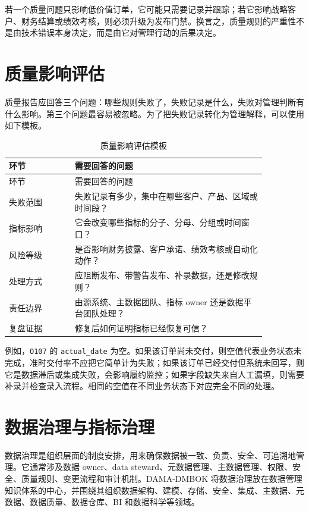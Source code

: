 \documentclass[UTF8,fontset=fandol,openany,zihao=-4]{ctexbook}
\begin{document}
若一个质量问题只影响低价值订单，它可能只需要记录并跟踪；若它影响战略客户、财务结算或绩效考核，则必须升级为发布门禁。换言之，质量规则的严重性不是由技术错误本身决定，而是由它对管理行动的后果决定。

\section{质量影响评估}

质量报告应回答三个问题：哪些规则失败了，失败记录是什么，失败对管理判断有什么影响。第三个问题最容易被忽略。为了把失败记录转化为管理解释，可以使用如下模板。

\begin{longtable}{>{\raggedright\arraybackslash}p{0.22\linewidth}>{\raggedright\arraybackslash}p{0.64\linewidth}}
\caption{质量影响评估模板}\\
\toprule
环节 & 需要回答的问题\\
\midrule
\endfirsthead
\toprule
环节 & 需要回答的问题\\
\midrule
\endhead
失败范围 & 失败记录有多少，集中在哪些客户、产品、区域或时间段？\\
指标影响 & 它会改变哪些指标的分子、分母、分组或时间窗口？\\
风险等级 & 是否影响财务披露、客户承诺、绩效考核或自动化动作？\\
处理方式 & 应阻断发布、带警告发布、补录数据，还是修改规则？\\
责任边界 & 由源系统、主数据团队、指标 owner 还是数据平台团队处理？\\
复盘证据 & 修复后如何证明指标已经恢复可信？\\
\bottomrule
\end{longtable}

例如，\texttt{O107} 的 \texttt{actual\_date} 为空。如果该订单尚未交付，则空值代表业务状态未完成，准时交付率不应把它简单计为失败；如果该订单已经交付但系统未回写，则它是数据滞后或集成失败，会影响履约监控；如果字段缺失来自人工漏填，则需要补录并检查录入流程。相同的空值在不同业务状态下对应完全不同的处理。

\section{数据治理与指标治理}

数据治理是组织层面的制度安排，用来确保数据被一致、负责、安全、可追溯地管理。它通常涉及数据 owner、data steward、元数据管理、主数据管理、权限、安全、质量规则、变更流程和审计机制。DAMA-DMBOK 将数据治理放在数据管理知识体系的中心，并围绕其组织数据架构、建模、存储、安全、集成、主数据、元数据、数据质量、数据仓库、BI 和数据科学等领域。
\end{document}
